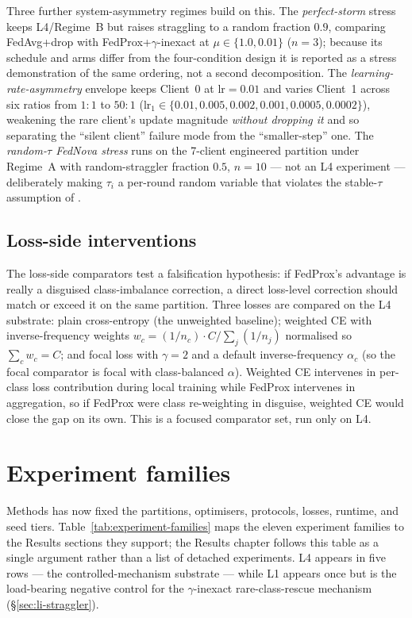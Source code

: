 \documentclass[11pt,a4paper]{report}
\begin{document}
Three further system-asymmetry regimes build on this. The \emph{perfect-storm}
stress keeps L4/Regime~B but raises straggling to a random fraction $0.9$,
comparing FedAvg+drop with FedProx+$\gamma$-inexact at $\mu \in \{1.0, 0.01\}$
($n = 3$); because its schedule and arms differ from the four-condition design it
is reported as a stress demonstration of the same ordering, not a second
decomposition. The \emph{learning-rate-asymmetry} envelope keeps Client~0 at
$\textrm{lr} = 0.01$ and varies Client~1 across six ratios from $1{:}1$ to $50{:}1$
($\textrm{lr}_1 \in \{0.01, 0.005, 0.002, 0.001, 0.0005, 0.0002\}$), weakening the
rare client's update magnitude \emph{without dropping it} and so separating the
``silent client'' failure mode from the ``smaller-step'' one. The
\emph{random-$\tau$ FedNova stress} runs on
the 7-client engineered partition under Regime~A with random-straggler fraction
$0.5$, $n = 10$ --- not an L4 experiment --- deliberately making $\tau_i$ a
per-round random variable that violates the stable-$\tau$ assumption of
\citet{wang2020fednova}.


\subsection{Loss-side interventions}
\label{sec:method-losses}

The loss-side comparators test a falsification hypothesis: if FedProx's advantage
is really a disguised class-imbalance correction, a direct loss-level correction
should match or exceed it on the same partition. Three losses are compared on the
L4 substrate: plain cross-entropy (the unweighted baseline); weighted CE with
inverse-frequency weights $w_c = (1/n_c)\cdot C / \sum_j (1/n_j)$ normalised so
$\sum_c w_c = C$; and focal loss \citep{lin2017focal} with $\gamma = 2$ and a
default inverse-frequency $\alpha_c$ (so the focal comparator is focal with
class-balanced $\alpha$). Weighted CE intervenes in per-class loss contribution
during local training while FedProx intervenes in aggregation, so if FedProx were
class re-weighting in disguise, weighted CE would close the gap on its own. This is
a focused comparator set, run only on L4.

\section{Experiment families}
\label{sec:method-roadmap}

Methods has now fixed the partitions, optimisers, protocols, losses, runtime, and
seed tiers. Table~\ref{tab:experiment-families} maps the eleven experiment families
to the Results sections they support; the Results chapter follows this table as a
single argument rather than a list of detached experiments. L4 appears in five
rows --- the controlled-mechanism substrate --- while L1 appears once but is the
load-bearing negative control for the $\gamma$-inexact rare-class-rescue mechanism
(\S\ref{sec:li-straggler}).
\end{document}
